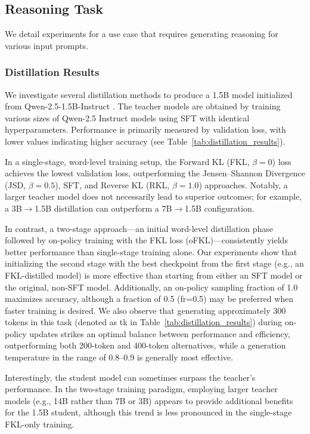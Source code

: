 \subsection{Reasoning Task}

We detail experiments for a use case that requires generating reasoning for various input prompts.

\subsubsection{Distillation Results}

We investigate several distillation methods to produce a 1.5B model initialized from Qwen-2.5-1.5B-Instruct \cite{yang2024qwen2}. The teacher models are obtained by training various sizes of Qwen-2.5 Instruct models using SFT with identical hyperparameters. Performance is primarily measured by validation loss, with lower values indicating higher accuracy (see Table~\ref{tab:distillation_results}). 

In a single-stage, word-level training setup, the Forward KL (FKL, $\beta=0$) loss achieves the lowest validation loss, outperforming the Jensen–Shannon Divergence (JSD, $\beta=0.5$), SFT, and Reverse KL (RKL, $\beta=1.0$) approaches. Notably, a larger teacher model does not necessarily lead to superior outcomes; for example, a 3B$\rightarrow$1.5B distillation can outperform a 7B$\rightarrow$1.5B configuration.

In contrast, a two-stage approach---an initial word-level distillation phase followed by on-policy training with the FKL loss (oFKL)---consistently yields better performance than single-stage training alone. Our experiments show that initializing the second stage with the best checkpoint from the first stage (e.g., an FKL-distilled model) is more effective than starting from either an SFT model or the original, non-SFT model. Additionally, an on-policy sampling fraction of 1.0 maximizes accuracy, although a fraction of 0.5 (fr=0.5) may be preferred when faster training is desired. We also observe that generating approximately 300 tokens in this task (denoted as tk in Table~\ref{tab:distillation_results}) during on-policy updates strikes an optimal balance between performance and efficiency, outperforming both 200-token and 400-token alternatives, while a generation temperature in the range of 0.8--0.9 is generally most effective.

Interestingly, the student model can sometimes surpass the teacher’s performance. In the two-stage training paradigm, employing larger teacher models (e.g., 14B rather than 7B or 3B) appears to provide additional benefits for the 1.5B student, although this trend is less pronounced in the single-stage FKL-only training.

